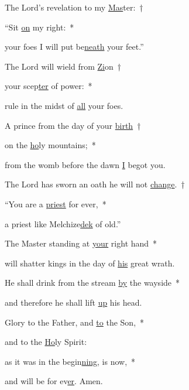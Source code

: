 
\noindent The Lord’s revelation to my \uline{Mas}ter:~†~

“Sit \uline{on} my right:~*~

your foes I will put be\uline{neath} your feet.”

\noindent The Lord will wield from \uline{Zi}on~†~

your scep\uline{ter} of power:~*~

rule in the midst of \uline{all} your foes.

\noindent A prince from the day of your \uline{birth}~†~

on the \uline{ho}ly mountains;~*~

from the womb before the dawn \uline{I} begot you.

\noindent The Lord has sworn an oath he will not \uline{change}.~†~

“You are a \uline{priest} for ever,~*~

a priest like Melchize\uline{dek} of old.”

\noindent The Master standing at \uline{your} right hand~*~

will shatter kings in the day of \uline{his} great wrath.

\noindent He shall drink from the stream \uline{by} the wayside~*~

and therefore he shall lift \uline{up} his head.

\noindent Glory to the Father, and \uline{to} the Son,~*~

and to the \uline{Ho}ly Spirit:

\noindent as it was in the begin\uline{ning}, is now,~*~

and will be for ev\uline{er}. Amen.